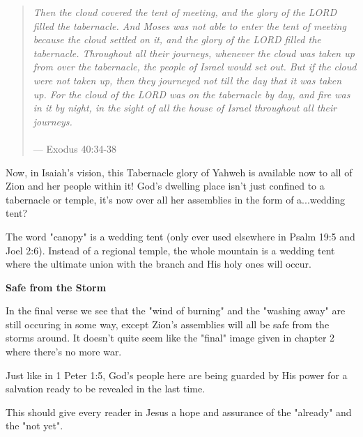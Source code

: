 \documentclass[11pt]{article}
\begin{document}
\begin{quote}
\textit{
Then the cloud covered the tent of meeting, and the glory of the LORD filled the tabernacle.
And Moses was not able to enter the tent of meeting because the cloud settled on it, and the glory of the LORD filled the tabernacle. 
Throughout all their journeys, whenever the cloud was taken up from over the tabernacle, the people of Israel would set out. 
But if the cloud were not taken up, then they journeyed not till the day that it was taken up.
For the cloud of the LORD was on the tabernacle by day, and fire was in it by night, in the sight of all the house of Israel throughout all their journeys.
}
\\\\
\hfill --- Exodus 40:34-38
\end{quote}

{\vspace{1em}}

Now, in Isaiah's vision, this Tabernacle glory of Yahweh is available now to all of Zion and her people within it! God's dwelling place isn't just confined to a tabernacle or temple, it's now over all her assemblies in the form of a...wedding tent?

{\vspace{1em}}

The word "canopy" is a wedding tent (only ever used elsewhere in Psalm 19:5 and Joel 2:6). Instead of a regional temple, the whole mountain is a wedding tent where the ultimate union with the branch and His holy ones will occur.

\vspace{3em}
{\large\bfseries Safe from the Storm}
\vspace{1em}

In the final verse we see that the "wind of burning" and the "washing away" are still occuring in some way, except Zion's assemblies will all be safe from the storms around. It doesn't quite seem like the "final" image given in chapter 2 where there's no more war.

Just like in 1 Peter 1:5, God's people here are being guarded by His power for a salvation ready to be revealed in the last time.

This should give every reader in Jesus a hope and assurance of the "already" and the "not yet".
\end{document}
